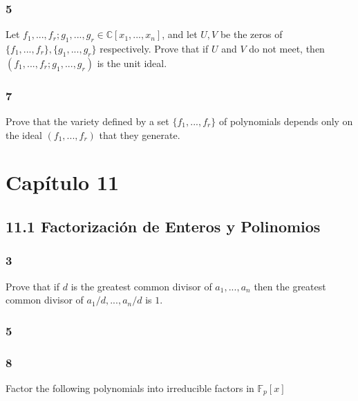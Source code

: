 \documentclass[11pt]{article}
\newcommand{\set}[1]{\mathbb{#1}}
\theoremstyle{definition}
\begin{document}
        \subsubsection{5}
        Let $f_1,...,f_r;g_1,...,g_r\in\set{C}[x_1,...,x_n]$, and let $U,V$ be the zeros of $\{f_1,...,f_r\},\{g_1,...,g_r\}$ respectively. Prove that if $U$ and $V$ do not meet, then $(f_1,...,f_r;g_1,...,g_r)$ is the unit ideal.

        \subsubsection{7}
        Prove that the variety defined by a set $\{f_1,...,f_r\}$ of polynomials depends only on the ideal $(f_1,...,f_r)$ that they generate.

        \section{Capítulo 11}
        \subsection{11.1 Factorización de Enteros y Polinomios}
        \subsubsection{3}
        Prove that if $d$ is the greatest common divisor of $a_1,...,a_n$ then the greatest common divisor of $a_1/d,...,a_n/d$ is $1$.

        \subsubsection{5}

        \subsubsection{8}
        Factor the following polynomials into irreducible factors in $\set{F}_p[x]$
    
\end{document}
